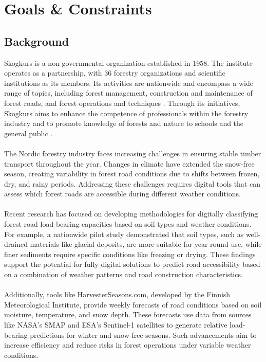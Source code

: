 \section{Goals \& Constraints}
\subsection{Background}
Skogkurs is a non-governmental organization established in 1958. The institute operates as a partnership, with 36 forestry organizations and scientific institutions as its members. Its activities are nationwide and encompass a wide range of topics, including forest management, construction and maintenance of forest roads, and forest operations and techniques \cite{skogkurs_eng}. Through its initiatives, Skogkurs aims to enhance the competence of professionals within the forestry industry and to promote knowledge of forests and nature to schools and the general public \cite{skogkurs_nor}. 
\\ \\
The Nordic forestry industry faces increasing challenges in ensuring stable timber transport throughout the year. Changes in climate have extended the snow-free season, creating variability in forest road conditions due to shifts between frozen, dry, and rainy periods. Addressing these challenges requires digital tools that can assess which forest roads are accessible during different weather conditions.
\\ \\
Recent research has focused on developing methodologies for digitally classifying forest road load-bearing capacities based on soil types and weather conditions. For example, a nationwide pilot study demonstrated that soil types, such as well-drained materials like glacial deposits, are more suitable for year-round use, while finer sediments require specific conditions like freezing or drying. These findings support the potential for fully digital solutions to predict road accessibility based on a combination of weather patterns and road construction characteristics.
\\ \\
Additionally, tools like HarvesterSeasons.com, developed by the Finnish Meteorological Institute, provide weekly forecasts of road conditions based on soil moisture, temperature, and snow depth. These forecasts use data from sources like NASA's SMAP and ESA's Sentinel-1 satellites to generate relative load-bearing predictions for winter and snow-free seasons. Such advancements aim to increase efficiency and reduce risks in forest operations under variable weather conditions.

